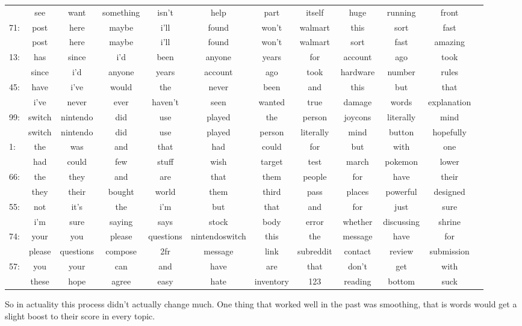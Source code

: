 \documentclass[11pt]{article} %
\begin{document}
\begin{landscape}
\begin{tabular}{|l|c c c c c c c c c c c}
        & see&want&something&isn't&help&part&itself&huge&running&front\\
71: &  post&here&maybe&i'll&found&won't&walmart&this&sort&fast\\
        & post&here&maybe&i'll&found&won't&walmart&sort&fast&amazing\\
13: &  has&since&i'd&been&anyone&years&for&account&ago&took\\
        & since&i'd&anyone&years&account&ago&took&hardware&number&rules\\
45: &  have&i've&would&the&never&been&and&this&but&that\\
        & i've&never&ever&haven't&seen&wanted&true&damage&words&explanation\\
99: &  switch&nintendo&did&use&played&the&person&joycons&literally&mind\\
        & switch&nintendo&did&use&played&person&literally&mind&button&hopefully\\
1: &  the&was&and&that&had&could&for&but&with&one\\
        & had&could&few&stuff&wish&target&test&march&pokemon&lower\\
66: &  the&they&and&are&that&them&people&for&have&their\\
        & they&their&bought&world&them&third&pass&places&powerful&designed\\
55: &  not&it's&the&i'm&but&that&and&for&just&sure\\
        & i'm&sure&saying&says&stock&body&error&whether&discussing&shrine\\
74: &  your&you&please&questions&nintendoswitch&this&the&message&have&for\\
        & please&questions&compose&2fr&message&link&subreddit&contact&review&submission\\
57: &  you&your&can&and&have&are&that&don't&get&with\\
        & these&hope&agree&easy&hate&inventory&123&reading&bottom&suck\\
\end{tabular}
So in actuality this process didn't actually change much. One thing that worked well in the past was smoothing, that is words would get a slight boost to their score in every topic. 


\end{landscape}
\end{document}
